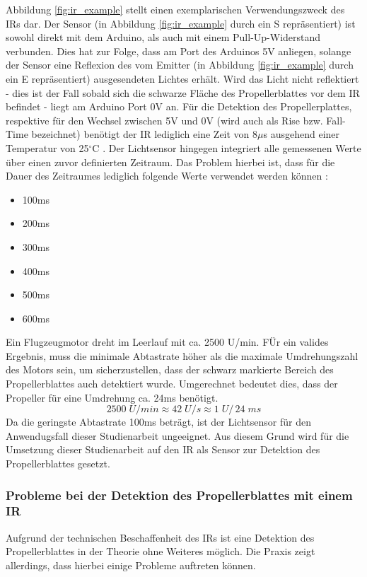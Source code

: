 Abbildung \ref{fig:ir_example} stellt einen exemplarischen Verwendungszweck des \ac{IR}s dar. 
Der Sensor (in Abbildung \ref{fig:ir_example} durch ein S repräsentiert) ist sowohl direkt mit dem Arduino, als auch mit einem Pull-Up-Widerstand verbunden.
Dies hat zur Folge, dass am Port des Arduinos 5\ac{V} anliegen, solange der Sensor eine Reflexion des vom Emitter (in Abbildung \ref{fig:ir_example} durch ein E repräsentiert) ausgesendeten Lichtes erhält.
Wird das Licht nicht reflektiert - dies ist der Fall sobald sich die schwarze Fläche des Propellerblattes vor dem \ac{IR} befindet - liegt am Arduino Port 0\ac{V} an.
Für die Detektion des Propellerplattes, respektive für den Wechsel zwischen 5\ac{V} und 0\ac{V} (wird auch als Rise bzw. Fall-Time bezeichnet) benötigt der \ac{IR} lediglich eine Zeit von 8$\mu$s ausgehend einer Temperatur von 25$^\circ$C \cite[S.2]{ir_datasheet}.
Der Lichtsensor hingegen integriert alle gemessenen Werte über einen zuvor definierten Zeitraum.
Das Problem hierbei ist, dass für die Dauer des Zeitraumes lediglich folgende Werte verwendet werden können \cite[S.13]{tsl2591_datasheet}:
\begin{itemize}
	\item 100ms
	\item 200ms
	\item 300ms
	\item 400ms
	\item 500ms
	\item 600ms
\end{itemize}
Ein Flugzeugmotor dreht im Leerlauf mit ca. 2500 U/min.
FÜr ein valides Ergebnis, muss die minimale Abtastrate höher als die maximale Umdrehungszahl des Motors sein, um sicherzustellen, dass der schwarz markierte Bereich des Propellerblattes auch detektiert wurde.
Umgerechnet bedeutet dies, dass der Propeller für eine Umdrehung ca. 24ms benötigt.
\begin{equation}
2500\;U/min \approx 42\;U/s \approx 1\;U/\,24\;ms
\label{equation_revolutions}
\end{equation}
Da die geringste Abtastrate 100ms beträgt, ist der Lichtsensor für den Anwendugsfall dieser Studienarbeit ungeeignet.
Aus diesem Grund wird für die Umsetzung dieser Studienarbeit auf den \ac{IR} als Sensor zur Detektion des Propellerblattes gesetzt.

\subsubsection*{Probleme bei der Detektion des Propellerblattes mit einem \ac{IR}}
Aufgrund der technischen Beschaffenheit des \ac{IR}s ist eine Detektion des Propellerblattes in der Theorie ohne Weiteres möglich.
Die Praxis zeigt allerdings, dass hierbei einige Probleme auftreten können.

